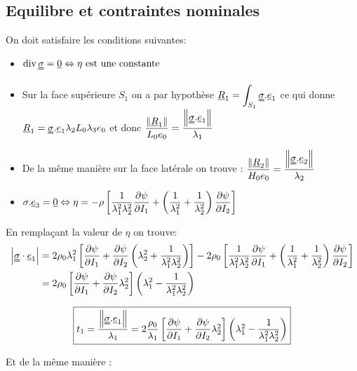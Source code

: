 \documentclass[a4paper,11pt]{article}
\newcommand{\FRAC}{\displaystyle\frac}
\newcommand{\tens}{\uuline}
\newcommand{\verseur}[1]{\uline{e}_{#1}}
\newcommand{\dive}{\mathop{\rm div}}
\begin{document}
\subsection{Equilibre et contraintes nominales}

On doit satisfaire les conditions suivantes:
\begin{itemize}
	\item $\dive{\uuline{\sigma}}=\uline{0} \Leftrightarrow \eta \text{ est une constante}$
	\item Sur la face supérieure $S_1$ on a par hypothèse $\displaystyle \uline{R}_1=\displaystyle \int_{S_1}\uuline{\sigma}.\uline{e}_1$ ce qui donne $\uline{R}_1=\uuline{\sigma}.\uline{e}_1\lambda_2L_0\lambda_3e_0$ et donc $\dfrac{\left\|\uline{R}_1\right\|}{L_0e_0}=\dfrac{\left\|\uuline{\sigma}.\uline{e}_1\right\|}{\lambda_1}$
	\item De la m\^eme mani\`ere sur la face latérale on trouve : $\dfrac{\left\|\uline{R}_2\right\|}{H_0e_0}=\dfrac{\left\|\uuline{\sigma}.\uline{e}_2\right\|}{\lambda_2}$
	\item $\displaystyle\sigma.\uline{e}_3=\uline{0}\Leftrightarrow \eta=-\rho\left[\dfrac{1}{\lambda_1^2\lambda_2^2}\dfrac{\partial \psi}{\partial I_1}+\left(\dfrac{1}{\lambda_1^2}+\dfrac{1}{\lambda_2^2}\right)\dfrac{\partial \psi}{\partial I_2}\right] $
\end{itemize}

En remplaçant la valeur de $\eta$ on trouve:
\begin{align*}
\left| \tens{\sigma} \cdot \verseur{1} \right| &= 2 \rho_0 \lambda_1^2 \left[ \FRAC{\partial\psi}{\partial I_1} + \FRAC{\partial\psi}{\partial I_2} \left( \lambda_2^2 + \FRAC{1}{\lambda_1^2 \lambda_2^2} \right) \right] - 2 \rho_0 \left[  \FRAC{1}{\lambda_1^2 \lambda_2^2} \FRAC{\partial\psi}{\partial I_1} + \left( \FRAC{1}{\lambda_1^2} + \FRAC{1}{\lambda_2^2} \right) \FRAC{\partial\psi}{\partial I_2} \right]\\
&=2\rho_0\left[\dfrac{\partial \psi}{\partial I_1}+\dfrac{\partial \psi}{\partial I_2}\lambda_2^2\right]\left(\lambda_1^2-\dfrac{1}{\lambda_1^2\lambda_2^2} \right)
\end{align*}

$$ \fbox{$t_1=\dfrac{\left\|\uuline{\sigma}.\uline{e}_1\right\|}{\lambda_1}= 2\dfrac{\rho_0}{\lambda_1}\left[\dfrac{\partial \psi}{\partial I_1}+\dfrac{\partial \psi}{\partial I_2}\lambda_2^2\right]\left(\lambda_1^2-\dfrac{1}{\lambda_1^2\lambda_2^2} \right)$}
$$

Et de la m\^eme mani\`ere :
\end{document}
